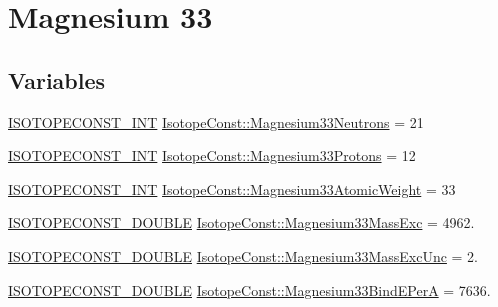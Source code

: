 \hypertarget{group___isotope_const-_magnesium-_mg33}{}\section{Magnesium 33}
\label{group___isotope_const-_magnesium-_mg33}
\subsection*{Variables}
\begin{DoxyCompactItemize}
\item 
\mbox{\hyperlink{group___isotope_const-_macros_ga5f18360b3e99483a35c32d789e62621c}{I\+S\+O\+T\+O\+P\+E\+C\+O\+N\+S\+T\+\_\+\+I\+NT}} \mbox{\hyperlink{group___isotope_const-_magnesium-_mg33_gac4bf61536117d2322dd758098214be0a}{Isotope\+Const\+::\+Magnesium33\+Neutrons}} = 21
\item 
\mbox{\hyperlink{group___isotope_const-_macros_ga5f18360b3e99483a35c32d789e62621c}{I\+S\+O\+T\+O\+P\+E\+C\+O\+N\+S\+T\+\_\+\+I\+NT}} \mbox{\hyperlink{group___isotope_const-_magnesium-_mg33_ga7f8fedfca69eb790b78e03fcbbf6dfa4}{Isotope\+Const\+::\+Magnesium33\+Protons}} = 12
\item 
\mbox{\hyperlink{group___isotope_const-_macros_ga5f18360b3e99483a35c32d789e62621c}{I\+S\+O\+T\+O\+P\+E\+C\+O\+N\+S\+T\+\_\+\+I\+NT}} \mbox{\hyperlink{group___isotope_const-_magnesium-_mg33_gaacb9fcdaf49c02834e3807929a81092d}{Isotope\+Const\+::\+Magnesium33\+Atomic\+Weight}} = 33
\item 
\mbox{\hyperlink{group___isotope_const-_macros_ga8f45a7272ce02c0b4c65c44636ed719a}{I\+S\+O\+T\+O\+P\+E\+C\+O\+N\+S\+T\+\_\+\+D\+O\+U\+B\+LE}} \mbox{\hyperlink{group___isotope_const-_magnesium-_mg33_gac4967bfd4ab7505d6924caf6d533ae1f}{Isotope\+Const\+::\+Magnesium33\+Mass\+Exc}} = 4962.
\item 
\mbox{\hyperlink{group___isotope_const-_macros_ga8f45a7272ce02c0b4c65c44636ed719a}{I\+S\+O\+T\+O\+P\+E\+C\+O\+N\+S\+T\+\_\+\+D\+O\+U\+B\+LE}} \mbox{\hyperlink{group___isotope_const-_magnesium-_mg33_ga589f69ed561a884abab77a78dc1fbd14}{Isotope\+Const\+::\+Magnesium33\+Mass\+Exc\+Unc}} = 2.
\item 
\mbox{\hyperlink{group___isotope_const-_macros_ga8f45a7272ce02c0b4c65c44636ed719a}{I\+S\+O\+T\+O\+P\+E\+C\+O\+N\+S\+T\+\_\+\+D\+O\+U\+B\+LE}} \mbox{\hyperlink{group___isotope_const-_magnesium-_mg33_gad12dd07fe1be596dfd29d370e80b87fc}{Isotope\+Const\+::\+Magnesium33\+Bind\+E\+PerA}} = 7636.
\item 

\end{DoxyCompactItemize}
